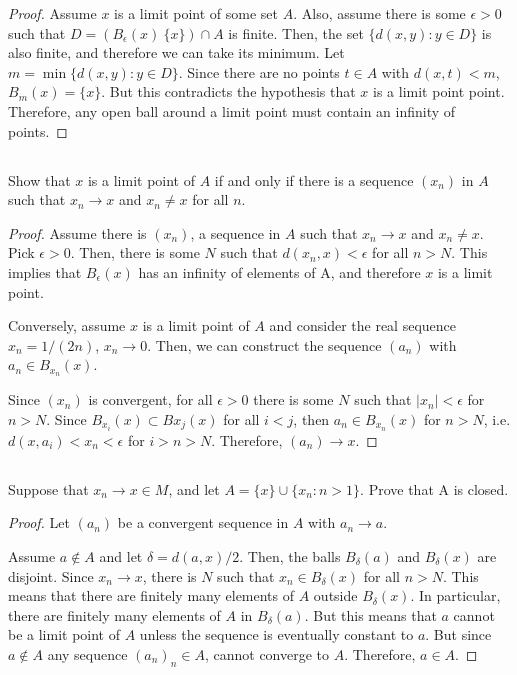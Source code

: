 \begin{proof}
Assume $x$ is a limit point of some set $A$. Also, assume there is some $\epsilon > 0$ such that $D = (B_\epsilon(x) \ \{x\}) \cap A$ is finite. Then, the set $\{d(x, y): y \in D\}$ is also finite, and therefore we can take its minimum. Let $m = \min\{d(x, y): y \in D\}$. Since there are no points $t\in A$ with $d(x,t) < m$, $B_m(x) = \{x\}$. But this contradicts the hypothesis that $x$ is a limit point point. Therefore, any open ball around a limit point must contain an infinity of points.
\end{proof}


\subsection{} Show that $x$ is a limit point of $A$ if and only if there  is a  sequence $(x_n)$ in $A$ such that $x_n \rightarrow x$ and $x_n \neq x$ for all $n$.

\begin{proof}
Assume there is $(x_n)$, a sequence in $A$ such that $x_n \rightarrow x$ and $x_n \neq x$. Pick $\epsilon > 0$. Then, there is some $N$ such that $d(x_n, x) < \epsilon$ for all $n>N$. This implies that $B_\epsilon(x)$ has an infinity of elements of A, and therefore $x$ is a limit point.

Conversely, assume $x$ is a limit point of $A$ and consider the real sequence $x_n = 1/(2n)$, $x_n \rightarrow 0$. Then, we can construct the sequence $(a_n)$ with $a_n \in B_{x_n}(x)$.

Since $(x_n)$ is convergent, for all $\epsilon > 0$ there is some $N$ such that $|x_n| < \epsilon$ for $n>N$. Since $B_{x_i}(x) \subset B{x_j}(x)$ for all $i < j$, then $a_n \in B_{x_n}(x)$ for $n>N$, i.e. $d(x, a_i) < x_n < \epsilon$ for $i > n > N$. Therefore, $(a_n) \rightarrow x$.
\end{proof}


\subsection{} Suppose  that $x_n \rightarrow x \in M$, and let $A = \{x\} \cup \{x_n :  n > 1\}$. Prove that A is closed.

\begin{proof}

Let $(a_n)$ be a convergent sequence in $A$ with $a_n \rightarrow a$.

Assume $a \notin A$ and let $\delta = d(a,x) / 2$. Then, the balls $B_\delta(a)$ and $B_\delta(x)$ are disjoint. Since $x_n \rightarrow x$, there is $N$ such that $x_n \in B_\delta(x)$ for all $n>N$. This means that there are finitely many elements of $A$ outside $B_\delta(x)$. In particular, there are finitely many elements of $A$ in $B_\delta(a)$. But this means that $a$ cannot be a limit point of $A$ unless the sequence is eventually constant to $a$. But since $a \notin A$ any sequence $(a_n)_n \in A$, cannot converge to $A$. Therefore, $a \in A$.

\end{proof}

